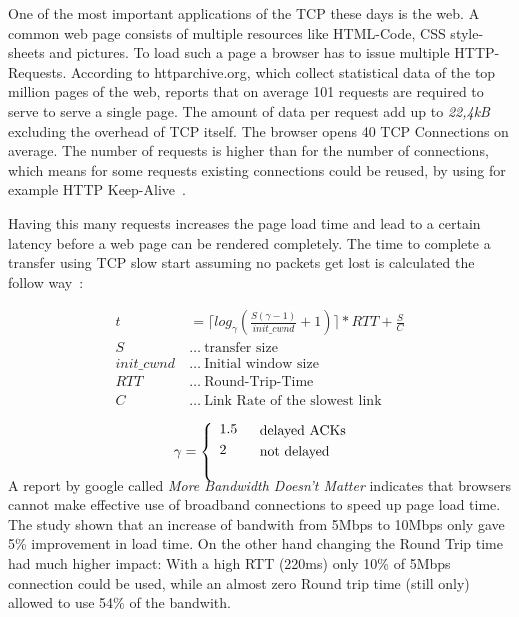 One of the most important applications of the TCP these days is the web. A
common web page consists of multiple resources like HTML-Code, CSS style-sheets
and pictures. To load such a page a browser has to issue multiple HTTP-Requests.
According to httparchive.org\cite{httparchive}, which collect statistical data
of the top million pages of the web, reports that on average 101 requests are
required to serve to serve a single page\cite{httparchive-trends}. The amount of
data per request add up to \emph{22,4kB} excluding the overhead of TCP itself.
The browser opens 40 TCP Connections on average. The number of requests is
higher than for the number of connections, which means for some requests
existing connections could be reused, by using for example HTTP
Keep-Alive~\cite{I-D.thomson-hybi-http-timeout}.

Having this many requests increases the page load time and lead to a certain
latency before a web page can be rendered completely. The time to complete a
transfer using TCP slow start assuming no packets get lost is calculated the
follow way~\cite{832574}:

\begin{align}
  t&=\lceil log_{\gamma} (\frac{S(\gamma - 1)}{init\_cwnd} + 1) \rceil * RTT + \frac{S}{C} \nonumber \\
  S~&\dots~\text{transfer size } \nonumber \\
  init\_cwnd~&\dots~\text{Initial window size} \nonumber \\
  RTT~&\dots~\text{Round-Trip-Time} \nonumber \\
  C~&\dots~\text{Link Rate of the slowest link} \nonumber\\
\end{align}
\begin{align}
  & && \text{delayed ACKs} \nonumber\\
  \gamma &=
    \smash{\left\{\begin{array}{lr}
       1.5 \\[\jot]
       2 \\
       \vspace{0.5em}
   \end{array}\right.} && \nonumber\text{not delayed} \\
\end{align}

A report by google called \emph{More Bandwidth Doesn’t Matter}\cite{bandwith}
indicates that browsers cannot make effective use of broadband connections to
speed up page load time. The study shown that an increase of bandwith from
5Mbps to 10Mbps only gave 5\% improvement in load time. On the other hand
changing the Round Trip time had much higher impact: With a high RTT (220ms)
only 10\% of 5Mbps connection could be used, while an almost zero Round trip
time (still only) allowed to use 54\% of the bandwith.
